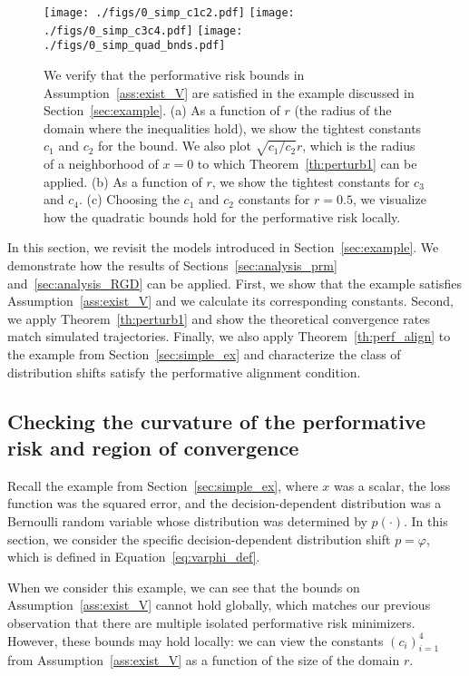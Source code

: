 
\begin{figure*}[t!]
  \centering
\texttt{[image: ./figs/0\_simp\_c1c2.pdf]}
\texttt{[image: ./figs/0\_simp\_c3c4.pdf]}
\texttt{[image: ./figs/0\_simp\_quad\_bnds.pdf]}
  \caption{We verify that the performative risk bounds in Assumption~\ref{ass:exist_V} are satisfied in the example discussed in Section~\ref{sec:example}. (a) As a function of $r$ (the radius of the domain where the inequalities hold), we show the tightest constants $c_1$ and $c_2$ for the bound. We also plot $\sqrt{c_1/c_2}r$, which is the radius of a neighborhood of $x=0$ to which Theorem~\ref{th:perturb1} can be applied. (b) As a function of $r$, we show the tightest constants for $c_3$ and $c_4$. (c) Choosing the $c_1$ and $c_2$ constants for $r = 0.5$, we visualize how the quadratic bounds hold for the performative risk locally.}
  \label{fig:simp_ex_demo}
\end{figure*}
In this section, we revisit the models introduced in Section~\ref{sec:example}. We demonstrate how the results of Sections~\ref{sec:analysis_prm} and~\ref{sec:analysis_RGD} can be applied. First, we show that the example satisfies Assumption~\ref{ass:exist_V} and we calculate its corresponding constants. Second, we apply Theorem~\ref{th:perturb1} and show the theoretical convergence rates match simulated trajectories. 
Finally, we also apply Theorem~\ref{th:perf_align} to the example from Section~\ref{sec:simple_ex} and characterize the class of distribution shifts satisfy the performative alignment condition.

\subsection{Checking the curvature of the performative risk and region of convergence}

Recall the example from Section~\ref{sec:simple_ex}, where $x$ was a scalar, the loss function was the squared error, and the decision-dependent distribution was a Bernoulli random variable whose distribution was determined by $p(\cdot)$. In this section, we consider the specific decision-dependent distribution shift $p = \varphi$, which is defined in Equation~\eqref{eq:varphi_def}.

When we consider this example, we can see that the bounds on Assumption~\ref{ass:exist_V} cannot hold globally, which matches our previous observation that there are multiple isolated performative risk minimizers. However, these bounds may hold locally: we can view the constants $(c_i)_{i=1}^4$ from Assumption~\ref{ass:exist_V} as a function of the size of the domain $r$.

